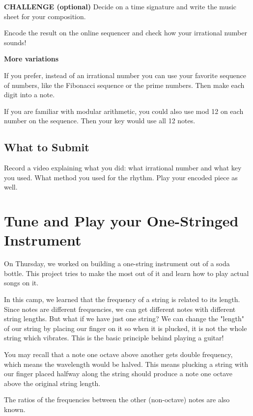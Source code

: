 \documentclass[12pt,noauthor,nooutcomes,hints,instructornotes]{ximera}%
\begin{document}
\textbf{CHALLENGE (optional)} Decide on a time signature and write the music sheet for your composition.

\begin{question} Encode the result on the online sequencer and check how your irrational number sounds! 
    
\end{question}

\textbf{More variations} 

If you prefer, instead of an irrational number you can use your favorite sequence of numbers, like the Fibonacci sequence or the prime numbers. Then make each digit into a note. 

If you are familiar with modular arithmetic, you could also use mod 12 on each number on the sequence. Then your key would use all 12 notes.



\subsection{What to Submit}
Record a video explaining what you did: what irrational number and what key you used. What method you used for the rhythm. Play your encoded piece as well.


\newpage
\section{Tune and Play your One-Stringed Instrument}

On Thursday, we worked on building a one-string instrument out of a soda bottle. This project tries to make the most out of it and learn how to play actual songs on it.

In this camp, we learned that the frequency of a string is related to its length.  Since notes are different frequencies, we can get different notes with different string lengths.  But what if we have just one string?  We can change the "length" of our string by placing our finger on it so when it is plucked, it is not the whole string which vibrates.  This is the basic principle behind playing a guitar!

You may recall that a note one octave above another gets double frequency, which means the wavelength would be halved.  This means plucking a string with our finger placed halfway along the string should produce a note one octave above the original string length.

The ratios of the frequencies between the other (non-octave) notes are also known.
\end{document}
